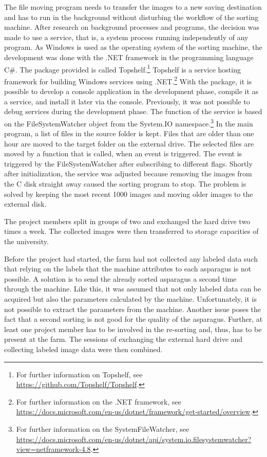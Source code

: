 The file moving program needs to transfer the images to a new saving destination and has to run in the background without disturbing the workflow of the sorting machine. After research on background processes and programs, the decision was made to use a service, that is, a system process running independently of any program. As Windows is used as the operating system of the sorting machine, the development was done with the .NET framework in the programming language C\#. The package provided is called Topshelf.\footnote{For further information on Topshelf, see \url{https://github.com/Topshelf/Topshelf}.} Topshelf is a service hosting framework for building Windows services using .NET.\footnote{For further information on the .NET framework, see \url{https://docs.microsoft.com/en-us/dotnet/framework/get-started/overview}.} With the package, it is possible to develop a console application in the development phase, compile it as a service, and install it later via the console. Previously, it was not possible to debug services during the development phase. The function of the service is based on the FileSystemWatcher object from the System.IO namespace.\footnote{For further information on the SystemFileWatcher, see \url{https://docs.microsoft.com/en-us/dotnet/api/system.io.filesystemwatcher?view=netframework-4.8}.} In the main program, a list of files in the source folder is kept. Files that are older than one hour are moved to the target folder on the external drive. The selected files are moved by a function that is called, when an event is triggered. The event is triggered by the FileSystemWatcher after subscribing to different flags. Shortly after initialization, the service was adjusted because removing the images from the C disk straight away caused the sorting program to stop. The problem is solved by keeping the most recent 1000 images and moving older images to the external disk.

\bigskip
The project members split in groups of two and exchanged the hard drive two times a week. The collected images were then transferred to storage capacities of the university.

Before the project had started, the farm had not collected any labeled data such that relying on the labels that the machine attributes to each asparagus is not possible. A solution is to send the already sorted asparagus a second time through the machine. Like this, it was assumed that not only labeled data can be acquired but also the parameters calculated by the machine. Unfortunately, it is not possible to extract the parameters from the machine. Another issue poses the fact that a second sorting is not good for the quality of the asparagus. Further, at least one project member has to be involved in the re-sorting and, thus, has to be present at the farm. The sessions of exchanging the external hard drive and collecting labeled image data were then combined.

